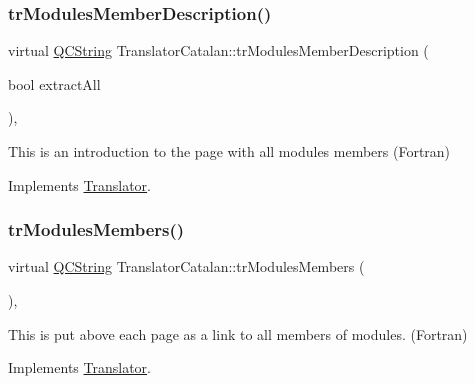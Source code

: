 \mbox{\label{class_translator_catalan_a19b3cfcc327ef2357a72f0abf8226c4d}} 
\subsubsection{\texorpdfstring{trModulesMemberDescription()}{trModulesMemberDescription()}}
{\footnotesize\ttfamily virtual \mbox{\hyperlink{class_q_c_string}{Q\+C\+String}} Translator\+Catalan\+::tr\+Modules\+Member\+Description (\begin{DoxyParamCaption}\item[{bool}]{extract\+All }\end{DoxyParamCaption})\hspace{0.3cm}{\ttfamily [inline]}, {\ttfamily [virtual]}}

This is an introduction to the page with all modules members (Fortran) 

Implements \mbox{\hyperlink{class_translator}{Translator}}.

\mbox{\label{class_translator_catalan_abf1a10749bae3892aa7ce52038a3a3e4}} 
\subsubsection{\texorpdfstring{trModulesMembers()}{trModulesMembers()}}
{\footnotesize\ttfamily virtual \mbox{\hyperlink{class_q_c_string}{Q\+C\+String}} Translator\+Catalan\+::tr\+Modules\+Members (\begin{DoxyParamCaption}{ }\end{DoxyParamCaption})\hspace{0.3cm}{\ttfamily [inline]}, {\ttfamily [virtual]}}

This is put above each page as a link to all members of modules. (Fortran) 

Implements \mbox{\hyperlink{class_translator}{Translator}}.

\mbox{\label{class_translator_catalan_aa9b54b13dbd48e7fff34f73fdf377811}} 
